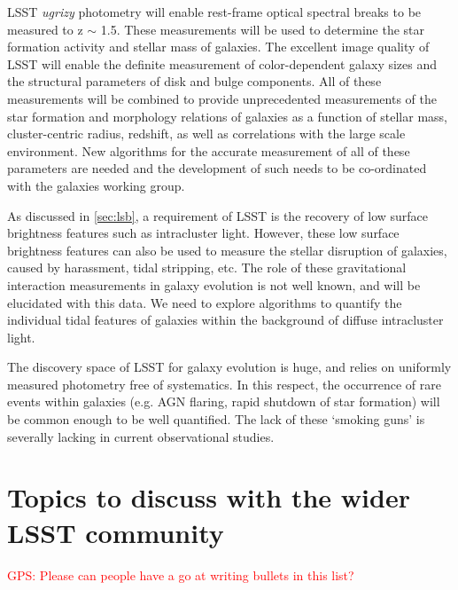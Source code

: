 \documentclass[a4paper,11pt]{article}
\newcommand{\red}{\textcolor{red}}
\begin{document}
LSST {\it ugrizy} photometry will enable rest-frame optical spectral breaks to be measured to z $\sim$ 1.5. These measurements will be used to determine the star formation activity and stellar mass of galaxies. The excellent image quality of LSST will enable the definite measurement of color-dependent galaxy sizes and the structural parameters of disk and bulge components. All of these measurements will be combined to provide unprecedented measurements of the star formation and morphology relations of galaxies as a function of stellar mass, cluster-centric radius, redshift, as well as correlations with the large scale environment. New algorithms for the accurate measurement of all of these parameters are needed and the development of such needs to be co-ordinated with the galaxies working group. 

As discussed in \textsection \ref{sec:lsb}, a requirement of LSST is the recovery of low surface brightness features such as intracluster light. However, these low surface brightness features can also be used to measure the stellar disruption of galaxies, caused by harassment, tidal stripping, etc. The role of these gravitational interaction measurements in galaxy evolution is not well known, and will be elucidated with this data. We need to explore algorithms to quantify the individual tidal features of galaxies within the background of diffuse intracluster light.

The discovery space of LSST for galaxy evolution is huge, and relies on uniformly measured photometry free of systematics. In this respect, the occurrence of rare events within galaxies (e.g. AGN flaring, rapid shutdown of star formation) will be common enough to be well quantified. The lack of these `smoking guns' is severally lacking in current observational studies. 







\section{Topics to discuss with the wider LSST community}

\red{GPS: Please can people have a go at writing bullets in this
  list?}
\end{document}
